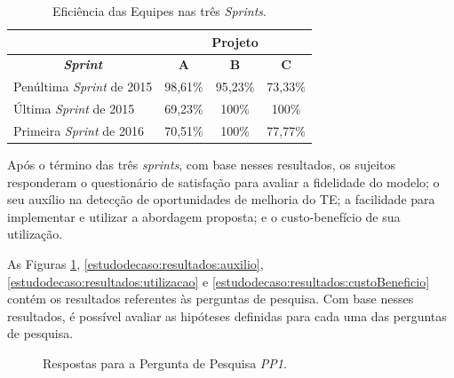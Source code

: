 \begin{table}[ht!]
\centering
\caption{Eficiência das Equipes nas três \textit{Sprints}.}
\label{estudodecaso:resultados:eficiencias}
\begin{tabular}{|l|c|c|c|}
\hline
\multicolumn{1}{|c|}{}                         & \multicolumn{3}{c|}{\textbf{Projeto}} \\ \hline
\multicolumn{1}{|c|}{\textbf{\textit{Sprint}}} & \textbf{A}  & \textbf{B} & \textbf{C} \\ \hline
Penúltima \textit{Sprint} de 2015              & 98,61\%     & 95,23\%    & 73,33\%    \\ \hline
Última \textit{Sprint} de 2015                 & 69,23\%     & 100\%      & 100\%      \\ \hline
Primeira \textit{Sprint} de 2016               & 70,51\%     & 100\%      & 77,77\%    \\ \hline
\end{tabular}
\end{table}

Após o término das três \textit{sprints}, com base nesses resultados, os sujeitos responderam o questionário de satisfação para avaliar a fidelidade do modelo; o seu auxílio na detecção de oportunidades de melhoria do TE; a facilidade para implementar e utilizar a abordagem proposta; e o custo-benefício de sua utilização.

As Figuras \ref{estudodecaso:resultados:fidelidade}, \ref{estudodecaso:resultados:auxilio}, \ref{estudodecaso:resultados:utilizacao} e \ref{estudodecaso:resultados:custoBeneficio} contém os resultados referentes às perguntas de pesquisa. Com base nesses resultados, é possível avaliar as hipóteses definidas para cada uma das perguntas de pesquisa.

\begin{figure}[ht!]
\begin{center}
	\end{center}
	\caption{Respostas para a Pergunta de Pesquisa \textit{PP1}.}
	\label{estudodecaso:resultados:fidelidade}
\end{figure}

